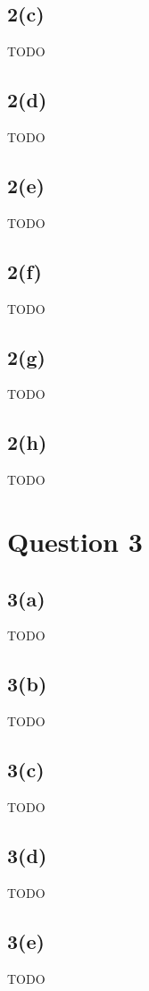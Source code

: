 \documentclass[10pt, a4paper,reqno]{article}
\begin{document}
\subsection*{2(c)}
TODO

\subsection*{2(d)}
TODO

\subsection*{2(e)}
TODO

\subsection*{2(f)}
TODO

\subsection*{2(g)}
TODO

\subsection*{2(h)}
TODO


%
%
\clearpage\section*{Question 3}

\subsection*{3(a)}
TODO

\subsection*{3(b)}
TODO

\subsection*{3(c)}
TODO

\subsection*{3(d)}
TODO

\subsection*{3(e)}
TODO
\end{document}
